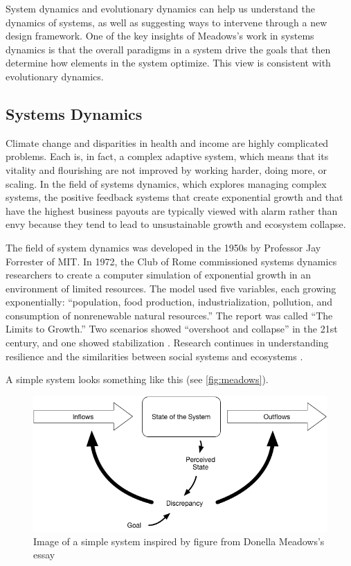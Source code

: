 System dynamics and evolutionary dynamics can help us understand the dynamics of systems, as well as suggesting ways to intervene through a new design framework. One of the key insights of Meadows's work in systems dynamics is that the overall paradigms in a system drive the goals that then determine how elements in the system optimize. This view is consistent with evolutionary dynamics.

\subsection{Systems Dynamics}

Climate change and disparities in health and income are highly complicated problems. Each is, in fact, a complex adaptive system, which means that its vitality and flourishing are not improved by working harder, doing more, or scaling. In the field of systems dynamics, which explores managing complex systems, the positive feedback systems that create exponential growth and that have the highest business payouts are typically viewed with alarm rather than envy because they tend to lead to unsustainable growth and ecosystem collapse.

The field of system dynamics was developed in the 1950s by Professor Jay Forrester of MIT. In 1972, the Club of Rome commissioned systems dynamics researchers to create a computer simulation of exponential growth in an environment of limited resources. The model used five variables, each growing exponentially: ``population, food production, industrialization, pollution, and consumption of nonrenewable natural resources.'' The report was called ``The Limits to Growth.'' Two scenarios showed ``overshoot and collapse'' in the 21st century, and one showed stabilization \cite{meadows_limits_2004}. Research continues in understanding resilience and the similarities between social systems and ecosystems \cite{folke2006resilience}. 

A simple system looks something like this (see \autoref{fig:meadows}).

\begin{figure}[h]
 \centering
 \includegraphics[width=1\textwidth]{pictures/System.png}
 \caption{Image of a simple system inspired by figure from Donella Meadows's essay \cite{meadows_leverage}}
 \label{fig:meadows}
\end{figure}

